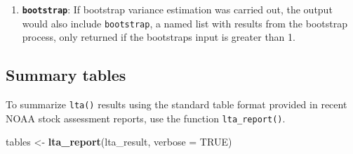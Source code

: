 \documentclass[
]{book}
\newenvironment{Shaded}{\begin{snugshade}}{\end{snugshade}}
\newcommand{\DataTypeTok}[1]{\textcolor[rgb]{0.13,0.29,0.53}{#1}}
\newcommand{\DecValTok}[1]{\textcolor[rgb]{0.00,0.00,0.81}{#1}}
\newcommand{\KeywordTok}[1]{\textcolor[rgb]{0.13,0.29,0.53}{\textbf{#1}}}
\newcommand{\NormalTok}[1]{#1}
\newcommand{\OperatorTok}[1]{\textcolor[rgb]{0.81,0.36,0.00}{\textbf{#1}}}
\newcommand{\OtherTok}[1]{\textcolor[rgb]{0.56,0.35,0.01}{#1}}
\newcommand{\StringTok}[1]{\textcolor[rgb]{0.31,0.60,0.02}{#1}}
\providecommand{\tightlist}{%
  \setlength{\itemsep}{0pt}\setlength{\parskip}{0pt}}
\begin{document}
\begin{enumerate}
\def\labelenumi{(\arabic{enumi})}
\setcounter{enumi}{4}
\tightlist
\item
  \textbf{\texttt{bootstrap}}: If bootstrap variance estimation was carried out, the output would also include \texttt{bootstrap}, a named list with results from the bootstrap process, only returned if the bootstraps input is greater than 1.
\end{enumerate}

\begin{Shaded}
\end{Shaded}

\begin{Shaded}
\end{Shaded}

\hypertarget{summary-tables}{%
\subsection*{Summary tables}\label{summary-tables}}

To summarize \texttt{lta()} results using the standard table format provided in recent NOAA stock assessment reports, use the function \texttt{lta\_report()}.

\begin{Shaded}
\begin{Highlighting}[]
\NormalTok{tables <-}\StringTok{ }\KeywordTok{lta_report}\NormalTok{(lta_result, }\DataTypeTok{verbose =} \OtherTok{TRUE}\NormalTok{)}
\end{Highlighting}
\end{Shaded}

\begin{Shaded}
\end{Shaded}
\end{document}
